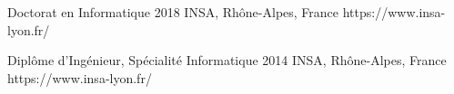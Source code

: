 \schooldiploma
{Doctorat en Informatique}
{2018}
{INSA, Rhône-Alpes, France}
{https://www.insa-lyon.fr/}

\schooldiploma
{Diplôme d’Ingénieur, Spécialité Informatique}
{2014}
{INSA, Rhône-Alpes, France}
{https://www.insa-lyon.fr/}
